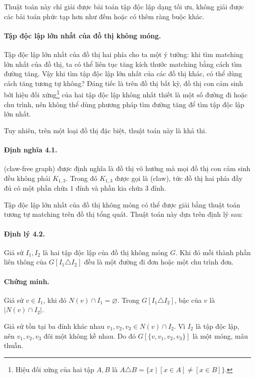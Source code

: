 \documentclass[11pt]{article}
\begin{document}
Thuật toán này chỉ giải được bài toán tập độc lập dạng tối ưu, không giải được
các bài toán phức tạp hơn như đếm hoặc có thêm ràng buộc khác.

\paragraph{Tập độc lập lớn nhất của đồ thị không móng.}
Tập độc lập lớn nhất của đồ thị hai phía cho ta một ý tưởng: khi tìm matching
lớn nhất của đồ thị, ta có thể liên tục tăng kích thước matching bằng cách tìm
đường tăng. Vậy khi tìm tập độc lập lớn nhất của các đồ thị khác, có thể dùng
cách tăng tương tự không? Đáng tiếc là trên đồ thị bất kỳ, đồ thị con cảm sinh
bởi hiệu đối xứng\footnote{Hiệu đối xứng của hai tập \(A,B\) là
\(A\triangle B=\{x\mid [x\in A]\ne[x\in B]\}\).} của hai tập độc lập không nhất
thiết là một số đường đi hoặc chu trình, nên không thể dùng phương pháp tìm
đường tăng để tìm tập độc lập lớn nhất.

Tuy nhiên, trên một loại đồ thị đặc biệt, thuật toán này là khả thi.

\paragraph{Định nghĩa 4.1.}
 (claw-free graph) được định nghĩa là đồ thị vô hướng
mà mọi đồ thị con cảm sinh đều không phải \(K_{1,3}\). Trong đó \(K_{1,3}\)
được gọi là  (claw), tức đồ thị hai phía đầy đủ có một phần chứa
\(1\) đỉnh và phần kia chứa \(3\) đỉnh.

Tập độc lập lớn nhất của đồ thị không móng có thể được giải bằng thuật toán
tương tự matching trên đồ thị tổng quát. Thuật toán này dựa trên định lý sau:

\paragraph{Định lý 4.2.}
Giả sử \(I_1,I_2\) là hai tập độc lập của đồ thị không móng \(G\). Khi đó mỗi
thành phần liên thông của \(G[I_1\triangle I_2]\) đều là một đường đi đơn hoặc
một chu trình đơn.

\paragraph{Chứng minh.}
Giả sử \(v\in I_1\), khi đó \(N(v)\cap I_1=\varnothing\). Trong
\(G[I_1\triangle I_2]\), bậc của \(v\) là \(|N(v)\cap I_2|\).

Giả sử tồn tại ba đỉnh khác nhau \(v_1,v_2,v_3\in N(v)\cap I_2\). Vì \(I_2\)
là tập độc lập, nên \(v_1,v_2,v_3\) đôi một không kề nhau. Do đó
\(G[\{v,v_1,v_2,v_3\}]\) là một móng, mâu thuẫn.
\end{document}
